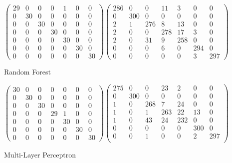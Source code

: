 \documentclass{article}
\begin{document}
	\begin{figure}[H]
	\begin{equation}
	\begin{pmatrix}
	29 & 0 & 0 & 0 & 1 & 0 & 0\\
	0 & 30 & 0 & 0 & 0 & 0 & 0\\
	0 & 0 & 30 & 0 & 0 & 0 & 0\\
	0 & 0 & 0 & 30 & 0 & 0 & 0\\
	0 & 0 & 0 & 0 & 30 & 0 & 0\\
	0 & 0 & 0 & 0 & 0 & 30 & 0\\
	0 & 0 & 0 & 0 & 0 & 0 & 30
	\end{pmatrix}
	\begin{pmatrix}
	286 & 0 & 0 & 11 & 3 & 0 & 0\\
	0 & 300 & 0 & 0 & 0 & 0 & 0\\
	2 & 1 & 276 & 8 & 13 & 0 & 0\\
	2 & 0 & 0 & 278 & 17 & 3 & 0\\
	2 & 0 & 31 & 9 & 258 & 0 & 0\\
	0 & 0 & 0 & 6 & 0 & 294 & 0\\
	0 & 0 & 0 & 0 & 0 & 3 & 297
	\end{pmatrix}
	\end{equation}
	\caption{Random Forest}
	\begin{equation}
	\begin{pmatrix}
	30 & 0 & 0 & 0 & 0 & 0 & 0\\
	0 & 30 & 0 & 0 & 0 & 0 & 0\\
	0 & 0 & 30 & 0 & 0 & 0 & 0\\
	0 & 0 & 0 & 29 & 1 & 0 & 0\\
	0 & 0 & 0 & 0 & 30 & 0 & 0\\
	0 & 0 & 0 & 0 & 0 & 30 & 0\\
	0 & 0 & 0 & 0 & 0 & 0 & 30
	\end{pmatrix}
	\begin{pmatrix}
	275 &  0 &  0 & 23  & 2  & 0 &  0\\
   0 & 300  & 0 &  0 &   0 &  0  & 0\\
   1 &  0 & 268  & 7 & 24 &  0 &  0\\
   1 &  0  & 1 & 263 & 22 & 13 &  0\\
   1 &  0 & 43 & 24 & 232  & 0 &   0\\
   0 &  0 &  0 &  0 &  0 &300 &  0\\
   0 &  0  & 1 &  0  & 0  & 2 & 297\\
	\end{pmatrix}
	\end{equation}
	\caption{Multi-Layer Perceptron}
\end{figure}	
\end{document}
